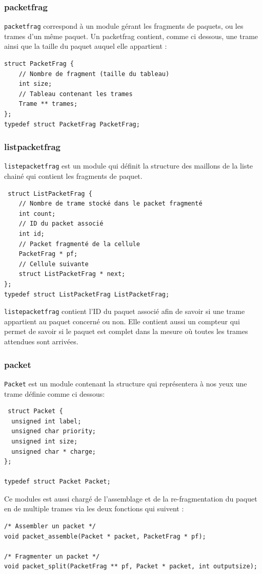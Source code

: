 \documentclass[a4paper,11pt]{article}
\begin{document}
\subsubsection{packetfrag}
\texttt{packetfrag} correspond à un module gérant les fragments de paquets, ou les trames d'un même paquet. Un packetfrag contient, comme ci dessous, une trame ainsi que la taille du paquet auquel elle appartient :\begin{verbatim}
struct PacketFrag {
    // Nombre de fragment (taille du tableau)
    int size;
    // Tableau contenant les trames
    Trame ** trames;
};
typedef struct PacketFrag PacketFrag;
\end{verbatim}
\subsubsection{listpacketfrag}
\texttt{listepacketfrag} est un module qui définit la structure des maillons de la liste chainé qui contient les fragments de paquet. 
\begin{verbatim}
 struct ListPacketFrag {
    // Nombre de trame stocké dans le packet fragmenté
    int count;
    // ID du packet associé
    int id;
    // Packet fragmenté de la cellule
    PacketFrag * pf;
    // Cellule suivante
    struct ListPacketFrag * next;
};
typedef struct ListPacketFrag ListPacketFrag;
\end{verbatim}
\texttt{listepacketfrag} contient l'ID du paquet associé afin de savoir si une trame appartient au paquet concerné ou non. Elle contient aussi un compteur qui permet de savoir si le paquet est complet dans la mesure où toutes les trames attendues sont arrivées.
\subsubsection{packet}
\texttt{Packet} est un module contenant la structure qui représentera à nos yeux une trame définie comme ci dessous:
\begin{verbatim}
 struct Packet {
  unsigned int label;
  unsigned char priority;
  unsigned int size;
  unsigned char * charge;
};

typedef struct Packet Packet;
\end{verbatim}
Ce modules est aussi chargé de l'assemblage et de la re-fragmentation du paquet en de multiple trames via les deux fonctions qui suivent :
\begin{verbatim}
/* Assembler un packet */
void packet_assemble(Packet * packet, PacketFrag * pf);

/* Fragmenter un packet */
void packet_split(PacketFrag ** pf, Packet * packet, int outputsize);
\end{verbatim}
\end{document}
